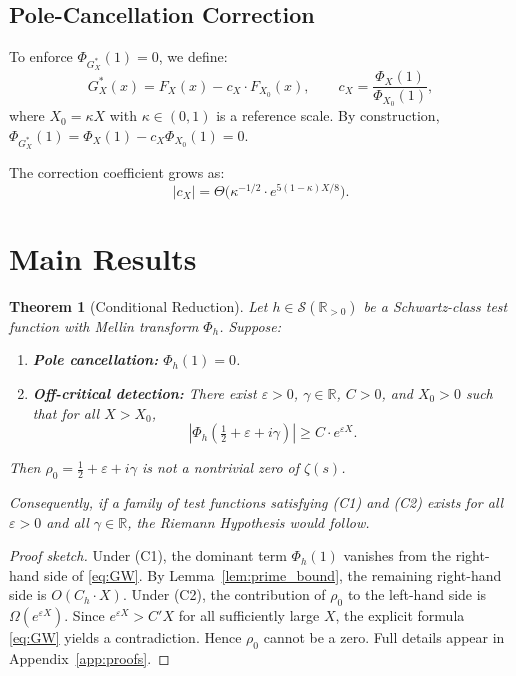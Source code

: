 \documentclass[12pt]{article}
\newtheorem{theorem}{Theorem}[section]
\theoremstyle{remark}
\begin{document}
\subsection{Pole-Cancellation Correction}

To enforce $\Phi_{G_X^*}(1) = 0$, we define:
\begin{equation}\label{eq:correction}
G_X^*(x) = F_X(x) - c_X \cdot F_{X_0}(x),
\qquad c_X = \frac{\Phi_X(1)}{\Phi_{X_0}(1)},
\end{equation}
where $X_0 = \kappa X$ with $\kappa \in (0,1)$ is a reference scale.
By construction, $\Phi_{G_X^*}(1) = \Phi_X(1) - c_X \Phi_{X_0}(1) = 0$.

The correction coefficient grows as:
\begin{equation}\label{eq:cX}
|c_X| = \Theta\bigl(\kappa^{-1/2} \cdot
  e^{5(1-\kappa)X/8}\bigr).
\end{equation}

\section{Main Results}\label{sec:main}

\begin{theorem}[Conditional Reduction]\label{thm:conditional}
Let $h \in \mathcal{S}(\mathbb{R}_{>0})$ be a Schwartz-class test function
with Mellin transform $\Phi_h$. Suppose:
\begin{enumerate}[\upshape (C1)]
\item \textbf{Pole cancellation:}
  $\Phi_h(1) = 0$.
\item \textbf{Off-critical detection:}
  There exist $\varepsilon > 0$, $\gamma \in \mathbb{R}$, $C > 0$, and
  $X_0 > 0$ such that for all $X > X_0$,
  \[
  |\Phi_h(\tfrac{1}{2} + \varepsilon + i\gamma)| \geq C \cdot e^{\varepsilon X}.
  \]
\end{enumerate}
Then $\rho_0 = \tfrac{1}{2} + \varepsilon + i\gamma$ is not a nontrivial
zero of $\zeta(s)$.

Consequently, if a family of test functions satisfying \textup{(C1)} and
\textup{(C2)} exists for all $\varepsilon > 0$ and all $\gamma \in \mathbb{R}$,
the Riemann Hypothesis would follow.
\end{theorem}

\begin{proof}[Proof sketch]
Under (C1), the dominant term $\Phi_h(1)$ vanishes from the right-hand side
of \eqref{eq:GW}. By Lemma~\ref{lem:prime_bound}, the remaining right-hand
side is $O(C_h \cdot X)$. Under (C2), the contribution of $\rho_0$ to the
left-hand side is $\Omega(e^{\varepsilon X})$. Since
$e^{\varepsilon X} > C' X$ for all sufficiently large $X$, the explicit
formula \eqref{eq:GW} yields a contradiction. Hence $\rho_0$ cannot be a
zero. Full details appear in Appendix~\ref{app:proofs}.
\end{proof}
\end{document}
